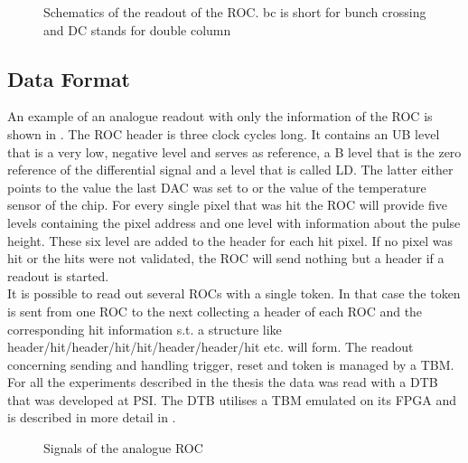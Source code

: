 \begin{figure}[ht]
	\centering
	\hfill
	\caption{Schematics of the readout of the \ac{ROC}. bc is short for bunch crossing and DC stands for double column}
	\label{pro}
\end{figure}\no
\subsection{Data Format}\label{sdata}
An example of an analogue readout with only the information of the \ac{ROC} is shown in . The \ac{ROC} header is three clock cycles long. It contains an \ac{UB} level that is a very low, negative level and serves as reference, a \ac{B} level that is the zero reference of the differential signal and a level that is called \ac{LD}. The latter either points to the value the last \ac{DAC} was set to or the value of the temperature sensor of the chip. For every single pixel that was hit the \ac{ROC} will provide five levels containing the pixel address and one level with information about the pulse height. These six level are added to the header for each hit pixel. If no pixel was hit or the hits were not validated, the \ac{ROC} will send nothing but a header if a readout is started.\\
It is possible to read out several \ac{ROC}s with a single token. In that case the token is sent from one \ac{ROC} to the next collecting a header of each \ac{ROC} and the corresponding hit information s.t. a structure like header/hit/header/hit/hit/header/header/hit etc. will form. The readout concerning sending and handling trigger, reset and token is managed by a \ac{TBM}. For all the experiments described in the thesis the data was read with a \ac{DTB} that was developed at \ac{PSI}. The \ac{DTB} utilises a \ac{TBM} emulated on its \ac{FPGA} and is described in more detail in .\\
\begin{figure}[ht]
	\centering
	\hfill
	\caption{Signals of the analogue \ac{ROC}}
	\label{procsig}
\end{figure}\no

